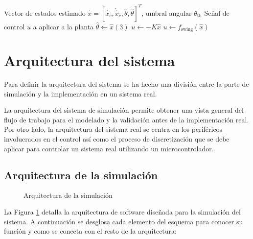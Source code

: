 \documentclass[11pt,fleqn]{book} %
\begin{document}
\begin{algorithm}[H]
	\caption{Lógica de Conmutación}
	\label{alg:conmutacion}
	\begin{algorithmic}[1]
		\Require Vector de estados estimado $\hat{x} = [\hat{x}_c, \dot{\hat{x}}_c, \hat{\theta}, \dot{\hat{\theta}}]^T$, umbral angular $\theta_{\text{th}}$
		\Ensure Señal de control $u$ a aplicar a la planta
		\Statex
		\Loop
		\State $\hat{\theta} \gets \hat{x}(3)$ 
		\State $u \gets -K \hat{x}$ 
		\Else 
		\State $u \gets f_{\text{swing}}(\hat{x})$ 
		\EndIf
		\State 
		\EndLoop
	\end{algorithmic}
\end{algorithm}
\newpage
\section{Arquitectura del sistema}

Para definir la arquitectura del sistema se ha hecho una división entre la parte de simulación y la implementación en un sistema real. 

La arquitectura del sistema de simulación permite obtener una vista general del flujo de trabajo para el modelado y la validación antes de la implementación real. Por otro lado, la arquitectura del sistema real se centra en los periféricos involucrados en el control así como el proceso de discretización que se debe aplicar para controlar un sistema real utilizando un microcontrolador. 

\subsection{Arquitectura de la simulación}

\begin{figure}[ht]
	\centering
	\resizebox{\textwidth}{!}{%
	}
	\caption{Arquitectura de la simulación}
	\label{fig:arquitectura_sim}
\end{figure}

\FloatBarrier

La Figura \ref{fig:arquitectura_sim} detalla la arquitectura de software diseñada para la simulación del sistema. A continuación se desglosa cada elemento del esquema para conocer su función y como se conecta con el resto de la arquitectura: 
\end{document}
